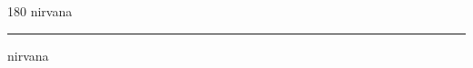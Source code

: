 
\begin{frame}
\begin{center}
\begin{turn}{180}
{\fontsize{2.5cm}{1em}\selectfont nirvana}
\end{turn}
\vspace{1em}\par  
\hrule
\vspace{1em}\par  
{\fontsize{2.5cm}{1em}\selectfont nirvana}
\end{center}
\end{frame}
